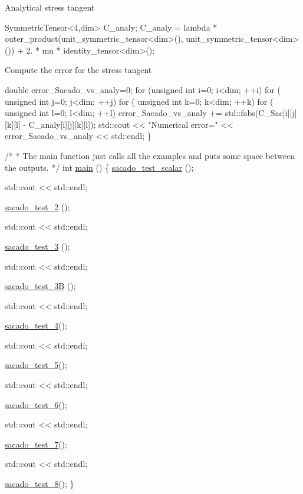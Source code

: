 Analytical stress tangent 
\begin{DoxyCode}
SymmetricTensor<4,dim> C\_analy;
C\_analy = lambda * outer\_product(unit\_symmetric\_tensor<dim>(), unit\_symmetric\_tensor<dim>()) + 2. * mu * 
      identity\_tensor<dim>();
\end{DoxyCode}
 Compute the error for the stress tangent 
\begin{DoxyCode}
     \textcolor{keywordtype}{double} error\_Sacado\_vs\_analy=0;
     \textcolor{keywordflow}{for} (\textcolor{keywordtype}{unsigned} \textcolor{keywordtype}{int} i=0; i<dim; ++i)
        \textcolor{keywordflow}{for} ( \textcolor{keywordtype}{unsigned} \textcolor{keywordtype}{int} j=0; j<dim; ++j)
            \textcolor{keywordflow}{for} ( \textcolor{keywordtype}{unsigned} \textcolor{keywordtype}{int} k=0; k<dim; ++k)
                \textcolor{keywordflow}{for} ( \textcolor{keywordtype}{unsigned} \textcolor{keywordtype}{int} l=0; l<dim; ++l)
                    error\_Sacado\_vs\_analy += std::fabs(C\_Sac[i][j][k][l] - C\_analy[i][j][k][l]);
     std::cout << \textcolor{stringliteral}{"Numerical error="} << error\_Sacado\_vs\_analy << std::endl;
\}
 
 
 
\textcolor{comment}{/*}
\textcolor{comment}{ * The main function just calls all the examples and puts some space between the outputs.}
\textcolor{comment}{ */}
\textcolor{keywordtype}{int} \hyperlink{Sacado__example_8cc_ae66f6b31b5ad750f1fe042a706a4e3d4}{main} ()
\{
    \hyperlink{Sacado__example_8cc_a71b2675e62203edc430e7ffc8a365193}{sacado\_test\_scalar} ();
 
    std::cout << std::endl;
 
    \hyperlink{Sacado__example_8cc_a8ef4ff1e9526ca8451cdcd1678366d2c}{sacado\_test\_2} ();
 
    std::cout << std::endl;
 
    \hyperlink{Sacado__example_8cc_ae45e1df0eec246dbb6f2c3d28a2a58e4}{sacado\_test\_3} ();
 
    std::cout << std::endl;
 
    \hyperlink{Sacado__example_8cc_ae63cc8526935cb0512668e83cfc7b929}{sacado\_test\_3B} ();
 
    std::cout << std::endl;
 
    \hyperlink{Sacado__example_8cc_a2f4def4563e31d720e07bc7d6363ebe2}{sacado\_test\_4}();
 
    std::cout << std::endl;
 
    \hyperlink{Sacado__example_8cc_a327dbbb4ea7fc9840c46d149843a44c2}{sacado\_test\_5}();
 
    std::cout << std::endl;
 
    \hyperlink{Sacado__example_8cc_a27450ab52a9d4250e3f5a5f2a3f8f317}{sacado\_test\_6}();
 
    std::cout << std::endl;
 
    \hyperlink{Sacado__example_8cc_a0b694459e5e15c1578d97e637faba8de}{sacado\_test\_7}();
 
    std::cout << std::endl;
 
    \hyperlink{Sacado__example_8cc_aa7108ff8393b98d66dfef50899d048d9}{sacado\_test\_8}();
\}
\end{DoxyCode}

